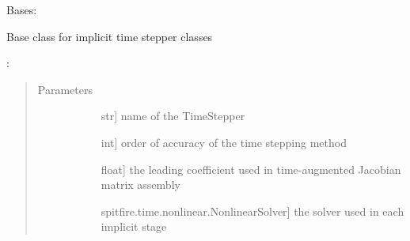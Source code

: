 \documentclass[letterpaper,10pt,english]{sphinxmanual}
\begin{document}
\begin{fulllineitems}
\label{\detokenize{spitfire.time.methods:spitfire.time.methods.ImplicitTimeStepper}}
Bases: {\hyperref[\detokenize{spitfire.time.methods:spitfire.time.methods.TimeStepper}]{}}

Base class for implicit time stepper classes

:
\begin{quote}\begin{description}
\item[{Parameters}] \leavevmode\begin{description}
\item[{}] \leavevmode{[}str{]}
name of the TimeStepper

\item[{}] \leavevmode{[}int{]}
order of accuracy of the time stepping method

\item[{}] \leavevmode{[}float{]}
the leading coefficient used in time-augmented Jacobian matrix assembly

\item[{}] \leavevmode{[}spitfire.time.nonlinear.NonlinearSolver{]}
the solver used in each implicit stage

\end{description}

\end{description}\end{quote}

\begin{fulllineitems}
\label{\detokenize{spitfire.time.methods:spitfire.time.methods.ImplicitTimeStepper.implicit_coefficient}}~
\end{fulllineitems}


\begin{fulllineitems}
\label{\detokenize{spitfire.time.methods:spitfire.time.methods.ImplicitTimeStepper.nonlinear_solver}}~
\end{fulllineitems}


\end{fulllineitems}
\end{document}
